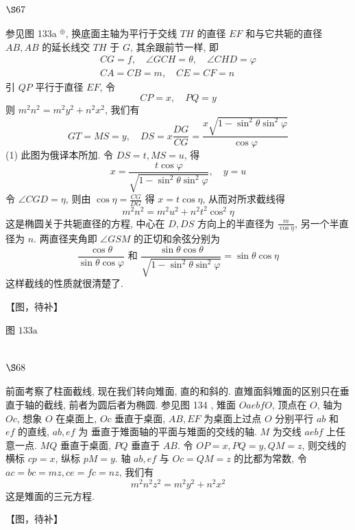 \section{$\S 67$}

参见图 133a ${ }^{\oplus}$, 换底面主轴为平行于交线 $T H$ 的直径 $E F$ 和与它共轭的直径 $A B, A B$ 的延长线交 $T H$ 于 $G$, 其余跟前节一样, 即
\[
\begin{gathered}
C G=f, \quad \angle G C H=\theta, \quad \angle C H D=\varphi \\
C A=C B=m, \quad C E=C F=n
\end{gathered}
\]
引 $Q P$ 平行于直径 $E F$, 令
\[
C P=x, \quad P Q=y
\]
则 $m^{2} n^{2}=m^{2} y^{2}+n^{2} x^{2}$, 我们有
\[
G T=M S=y, \quad D S=x \frac{D G}{C G}=\frac{x \sqrt{1-\sin ^{2} \theta \sin ^{2} \varphi}}{\cos \varphi}
\]
(1) 此图为俄译本所加. 令 $D S=t, M S=u$, 得
\[
x=\frac{t \cos \varphi}{\sqrt{1-\sin ^{2} \theta \sin ^{2} \varphi}}, \quad y=u
\]
令 $\angle C G D=\eta$, 则由 $\cos \eta=\frac{C G}{D G}$ 得 $x=t \cos \eta$, 从而对所求截线得
\[
m^{2} n^{2}=m^{2} u^{2}+n^{2} t^{2} \cos ^{2} \eta
\]
这是椭圆关于共轭直径的方程, 中心在 $D, D S$ 方向上的半直径为 $\frac{m}{\cos \eta}$, 另一个半直径为 $n$. 两直径夹角即 $\angle G S M$ 的正切和余弦分别为
\[
\frac{\cos \theta}{\sin \theta \cos \varphi} \text { 和 } \frac{\sin \theta \cos \theta}{\sqrt{1-\sin ^{2} \theta \sin ^{2} \varphi}}=\sin \theta \cos \eta
\]
这样截线的性质就很清楚了.


【图，待补】

图 $133 \mathrm{a}$

\section{$\S 68$}

前面考察了柱面截线, 现在我们转向雉面, 直的和斜的. 直雉面斜雉面的区别只在垂 直于轴的截线, 前者为圆后者为椭圆. 参见图 134 , 雉面 $O a e b f O$, 顶点在 $O$, 轴为 $O c$, 想象 $O$ 在桌面上, $O c$ 垂直于桌面, $A B, E F$ 为桌面上过点 $O$ 分别平行 $a b$ 和 $e f$ 的直线, $a b, e f$ 为 垂直于雉面轴的平面与雉面的交线的轴. $M$ 为交线 $a e b f$ 上任意一点. $M Q$ 垂直于桌面, $P Q$ 垂直于 $A B$. 令 $O P=x, P Q=y, Q M=z$, 则交线的横标 $c p=x$, 纵标 $p M=y$. 轴 $a b, e f$ 与 $O c=Q M=z$ 的比都为常数, 令 $a c=b c=m z, c e=f c=n z$, 我们有
\[
m^{2} n^{2} z^{2}=m^{2} y^{2}+n^{2} x^{2}
\]
这是雉面的三元方程.


【图，待补】

